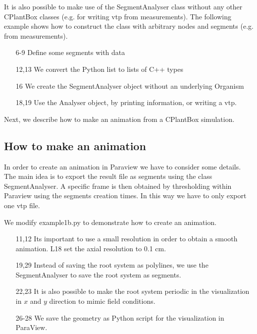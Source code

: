 It is also possible to make use of the SegmentAnalyser class without any other CPlantBox classes (e.g. for writing vtp from measurements). The following example shows how to construct the class with arbitrary nodes and segments (e.g. from measurements). 



\begin{itemize}
 \item[6-9] Define some segments with data
 \item[12,13] We convert the Python list to lists of C++ types
 \item[16] We create the SegmentAnalyser object without an underlying Organism
 \item[18,19] Use the Analyser object, by printing information, or writing a vtp. 
\end{itemize}

Next, we describe how to make an animation from a CPlantBox simulation.


\subsection{How to make an animation} \label{ssec:animation}

In order to create an animation in Paraview we have to consider some details. The main idea is to export the result file as segments using the class SegmentAnalyser. A specific frame is then obtained by thresholding within Paraview using the segments creation times. In this way we have to only export one vtp file. 

We modify example1b.py to demonstrate how to create an animation.

 

\begin{itemize}

\item[11,12] Its important to use a small resolution in order to obtain a smooth animation. L18 set the axial resolution to 0.1 cm. 

\item[19,29] Instead of saving the root system as polylines, we use the SegmentAnalyser to save the root system as segments.

\item[22,23] It is also possible to make the root system periodic in the visualization in $x$ and $y$ direction to mimic field conditions.

\item[26-28] We save the geometry as Python script for the visualization in ParaView.

\end{itemize}

